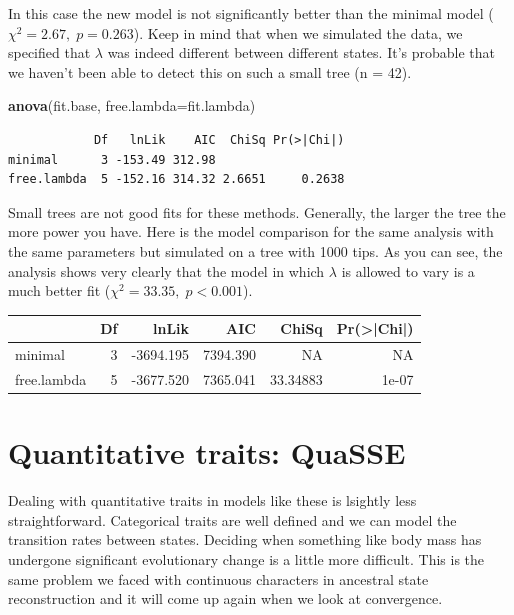 \documentclass[
]{book}
\newenvironment{Shaded}{\begin{snugshade}}{\end{snugshade}}
\newcommand{\DataTypeTok}[1]{\textcolor[rgb]{0.13,0.29,0.53}{#1}}
\newcommand{\KeywordTok}[1]{\textcolor[rgb]{0.13,0.29,0.53}{\textbf{#1}}}
\newcommand{\NormalTok}[1]{#1}
\begin{document}
In this case the new model is not significantly better than the minimal model (\(\chi^{2} = 2.67, \; p = 0.263\)). Keep in mind that when we simulated the data, we specified that \(\lambda\) was indeed different between different states. It's probable that we haven't been able to detect this on such a small tree (n = 42).

\begin{Shaded}
\begin{Highlighting}[]
\KeywordTok{anova}\NormalTok{(fit.base, }\DataTypeTok{free.lambda=}\NormalTok{fit.lambda)}
\end{Highlighting}
\end{Shaded}

\begin{verbatim}
            Df   lnLik    AIC  ChiSq Pr(>|Chi|)
minimal      3 -153.49 312.98                  
free.lambda  5 -152.16 314.32 2.6651     0.2638
\end{verbatim}

Small trees are not good fits for these methods. Generally, the larger the tree the more power you have. Here is the model comparison for the same analysis with the same parameters but simulated on a tree with 1000 tips. As you can see, the analysis shows very clearly that the model in which \(\lambda\) is allowed to vary is a much better fit (\(\chi^{2} = 33.35, \; p < 0.001\)).

\begin{tabular}{l|r|r|r|r|r}
\hline
  & Df & lnLik & AIC & ChiSq & Pr(>|Chi|)\\
\hline
minimal & 3 & -3694.195 & 7394.390 & NA & NA\\
\hline
free.lambda & 5 & -3677.520 & 7365.041 & 33.34883 & 1e-07\\
\hline
\end{tabular}

\hypertarget{quantitative-traits-quasse}{%
\section{Quantitative traits: QuaSSE}\label{quantitative-traits-quasse}}

Dealing with quantitative traits in models like these is lsightly less straightforward. Categorical traits are well defined and we can model the transition rates between states. Deciding when something like body mass has undergone significant evolutionary change is a little more difficult. This is the same problem we faced with continuous characters in ancestral state reconstruction and it will come up again when we look at convergence.
\end{document}
